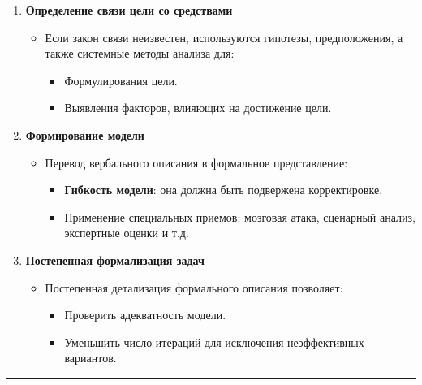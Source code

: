 \documentclass[
]{article}
\providecommand{\tightlist}{%
  \setlength{\itemsep}{0pt}\setlength{\parskip}{0pt}}
\begin{document}
\begin{enumerate}
\def\labelenumi{\arabic{enumi}.}
\item
  \textbf{Определение связи цели со средствами}

  \begin{itemize}
  \tightlist
  \item
    Если закон связи неизвестен, используются гипотезы, предположения, а
    также системные методы анализа для:

    \begin{itemize}
    \tightlist
    \item
      Формулирования цели.
    \item
      Выявления факторов, влияющих на достижение цели.
    \end{itemize}
  \end{itemize}
\item
  \textbf{Формирование модели}

  \begin{itemize}
  \tightlist
  \item
    Перевод вербального описания в формальное представление:

    \begin{itemize}
    \tightlist
    \item
      \textbf{Гибкость модели}: она должна быть подвержена
      корректировке.
    \item
      Применение специальных приемов: мозговая атака, сценарный анализ,
      экспертные оценки и т.д.
    \end{itemize}
  \end{itemize}
\item
  \textbf{Постепенная формализация задач}

  \begin{itemize}
  \tightlist
  \item
    Постепенная детализация формального описания позволяет:

    \begin{itemize}
    \tightlist
    \item
      Проверить адекватность модели.
    \item
      Уменьшить число итераций для исключения неэффективных вариантов.
    \end{itemize}
  \end{itemize}
\end{enumerate}

\begin{center}\rule{0.5\linewidth}{0.5pt}\end{center}
\end{document}
